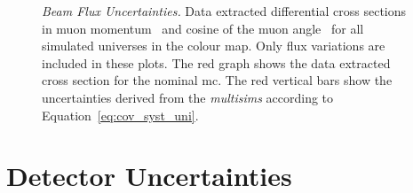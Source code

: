 \begin{figure}[t]
\centering
{}
\caption[Beam Flux Uncertainties - Single-Differential Cross Sections - Universes Distributions]{\emph{Beam Flux Uncertainties.} 
Data extracted differential cross sections in muon momentum~\protect{} and cosine of the muon angle~\protect{} for all simulated universes in the colour map. Only flux variations are included in these plots. The red graph shows the data extracted cross section for the nominal \acrshort{mc}. The red vertical bars show the uncertainties derived from the \emph{multisims} according to Equation~\eqref{eq:cov_syst_uni}.}
\label{fig:flux_multisim}
\end{figure}







\clearpage
\section{Detector Uncertainties}
\label{sec:error_detector}

